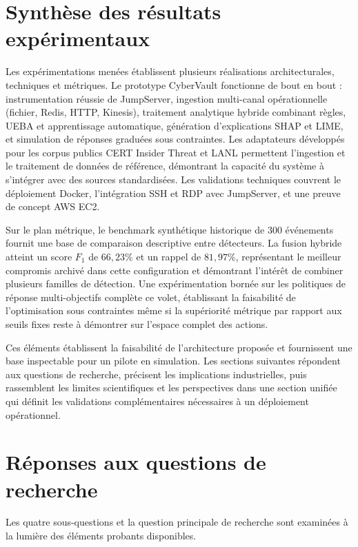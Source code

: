 \documentclass[11pt,a4paper,oneside]{report}
\theoremstyle{definition}
\theoremstyle{plain}
\begin{document}
\section{Synthèse des résultats expérimentaux}
\label{sec:discussion-results}

Les expérimentations menées établissent plusieurs réalisations architecturales, techniques et métriques. Le prototype CyberVault fonctionne de bout en bout : instrumentation réussie de JumpServer, ingestion multi-canal opérationnelle (fichier, Redis, HTTP, Kinesis), traitement analytique hybride combinant règles, UEBA et apprentissage automatique, génération d'explications SHAP et LIME, et simulation de réponses graduées sous contraintes. Les adaptateurs développés pour les corpus publics CERT Insider Threat et LANL permettent l'ingestion et le traitement de données de référence, démontrant la capacité du système à s'intégrer avec des sources standardisées. Les validations techniques couvrent le déploiement Docker, l'intégration SSH et RDP avec JumpServer, et une preuve de concept AWS EC2.

Sur le plan métrique, le benchmark synthétique historique de 300 événements fournit une base de comparaison descriptive entre détecteurs. La fusion hybride atteint un score $F_1$ de $66{,}23\%$ et un rappel de $81{,}97\%$, représentant le meilleur compromis archivé dans cette configuration et démontrant l'intérêt de combiner plusieurs familles de détection. Une expérimentation bornée sur les politiques de réponse multi-objectifs complète ce volet, établissant la faisabilité de l'optimisation sous contraintes même si la supériorité métrique par rapport aux seuils fixes reste à démontrer sur l'espace complet des actions.

Ces éléments établissent la faisabilité de l'architecture proposée et fournissent une base inspectable pour un pilote en simulation. Les sections suivantes répondent aux questions de recherche, précisent les implications industrielles, puis rassemblent les limites scientifiques et les perspectives dans une section unifiée qui définit les validations complémentaires nécessaires à un déploiement opérationnel.


\section{Réponses aux questions de recherche}
\label{sec:validation-rqs}

Les quatre sous-questions et la question principale de recherche sont examinées à la lumière des éléments probants disponibles.
\end{document}
